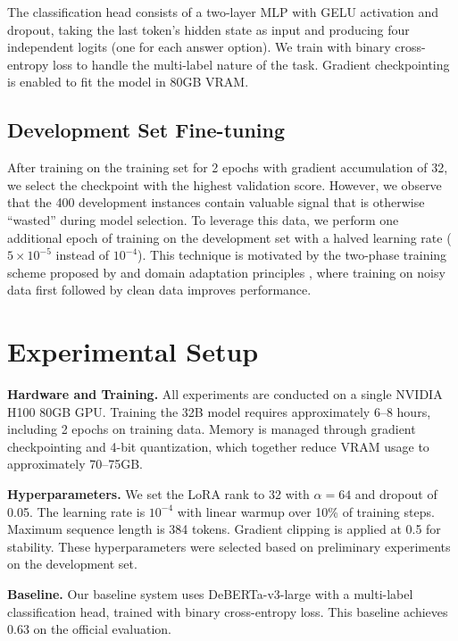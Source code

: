 \documentclass[11pt]{article}
\begin{document}
The classification head consists of a two-layer MLP with GELU activation and dropout, taking the last token's hidden state as input and producing four independent logits (one for each answer option). We train with binary cross-entropy loss to handle the multi-label nature of the task. Gradient checkpointing is enabled to fit the model in 80GB VRAM.

\subsection{Development Set Fine-tuning}
\label{sec:training}

After training on the training set for 2 epochs with gradient accumulation of 32, we select the checkpoint with the highest validation score. However, we observe that the 400 development instances contain valuable signal that is otherwise ``wasted'' during model selection. To leverage this data, we perform one additional epoch of training on the development set with a halved learning rate ($5 \times 10^{-5}$ instead of $10^{-4}$). This technique is motivated by the two-phase training scheme proposed by \citet{zhu2023weaker} and domain adaptation principles \cite{gururangan2020dont}, where training on noisy data first followed by clean data improves performance.

\section{Experimental Setup}

\textbf{Hardware and Training.} All experiments are conducted on a single NVIDIA H100 80GB GPU. Training the 32B model requires approximately 6--8 hours, including 2 epochs on training data. Memory is managed through gradient checkpointing and 4-bit quantization, which together reduce VRAM usage to approximately 70--75GB.

\textbf{Hyperparameters.} We set the LoRA rank to 32 with $\alpha = 64$ and dropout of 0.05. The learning rate is $10^{-4}$ with linear warmup over 10\% of training steps. Maximum sequence length is 384 tokens. Gradient clipping is applied at 0.5 for stability. These hyperparameters were selected based on preliminary experiments on the development set.

\textbf{Baseline.} Our baseline system uses DeBERTa-v3-large \cite{he2021deberta} with a multi-label classification head, trained with binary cross-entropy loss. This baseline achieves 0.63 on the official evaluation.
\end{document}
